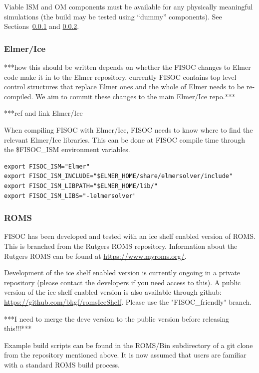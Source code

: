 \documentclass[12pt]{article}
\begin{document}
Viable ISM and OM components must be available for any physically meaningful simulations
(the build may be tested using ``dummy'' components).  
See Sections~\ref{sec:PreReqElmer} and \ref{sec:PreReqROMS}.


\subsubsection{Elmer/Ice}
\label{sec:PreReqElmer}

***how this should be written depends on whether the FISOC changes to 
Elmer code make it in to the Elmer repository. currently FISOC contains 
top level control structures that replace Elmer ones and the whole of 
Elmer needs to be re-compiled.  We aim to commit these changes to the 
main Elmer/Ice repo.***

***ref and link Elmer/Ice

When compiling FISOC with Elmer/Ice, FISOC needs to know where to 
find the relevant Elmer/Ice libraries.  
This can be done at FISOC compile time through the 
\$FISOC\_ISM
environment variables.  


\begin{lstlisting}
export FISOC_ISM="Elmer"
export FISOC_ISM_INCLUDE="$ELMER_HOME/share/elmersolver/include"
export FISOC_ISM_LIBPATH="$ELMER_HOME/lib/"
export FISOC_ISM_LIBS="-lelmersolver"
\end{lstlisting}





\subsubsection{ROMS}
\label{sec:PreReqROMS}

FISOC has been developed and tested with an ice shelf enabled version of ROMS. 
This is branched from the Rutgers ROMS repository.  Information about the Rutgers ROMS 
can be found at \url{https://www.myroms.org/}.

Development of the ice shelf enabled version  is currently ongoing in a private repository 
(please contact the developers if you need access to this).
A public version of the ice shelf enabled version is also available through github: 
\url{https://github.com/bkgf/romsIceShelf}.  
Please use the "FISOC\_friendly" branch.

***I need to merge the deve version to the public version before releasing this!!!***

Example build scripts can be found in the ROMS/Bin subdirectory of a git clone 
from the repository mentioned above.
It is now assumed that users are familiar with a standard ROMS build process. 
\end{document}
